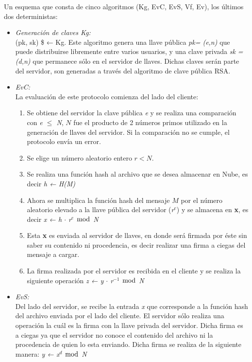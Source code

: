 Un esquema que consta de cinco algoritmos (Kg, EvC, EvS, Vf, Ev), los últimos dos deterministas: 

\begin{itemize}
\item \textit{Generación de claves Kg: } \\
(pk, sk) \$ ← Kg. Este algoritmo genera una llave pública \textit{pk= (e,n)} que puede distribuirse libremente entre varios usuarios, y una clave privada \textit{sk = (d,n)} que permanece sólo en el servidor de llaves. Dichas claves serán parte del servidor, son generadas a través del algoritmo de clave pública RSA.


\item \textit{EvC: }\\ 
La evaluación de este protocolo comienza del lado del cliente: 
\begin {enumerate}
\item Se obtiene del servidor la clave pública \textit{e} y se realiza una comparación con \textit{e $\leq$ N}, $N$ fue el producto de 2 números primos utilizado en la generación de llaves del servidor. Si la comparación no se cumple, el protocolo envía un error.
\item Se elige un número aleatorio entero $r<N$.
\item Se realiza una función hash al archivo que se desea almacenar en Nube, es decir \textit{h ← H(M)} 
\item Ahora se multiplica la función hash del mensaje $M$ por el número aleatorio elevado a la llave pública del servidor (\textit{r$^e$}) y se almacena en \textbf{x}, es decir \textit{x ← h $\cdot$ r$^e$ $\bmod$ N}
\item Esta \textbf{x} es enviada al servidor de llaves, en donde será firmada por éste sin saber su contenido ni procedencia, es decir realizar una firma a ciegas del mensaje a cargar.
\item La firma realizada por el servidor es recibida en el cliente y se realiza la siguiente operación \hspace{2cm} \textit{z ← y $\cdot$ r$^{-1}$ $\bmod$ N}


\end{enumerate}
\item \textit{EvS: }\\ 
Del lado del servidor, se recibe la entrada \textit{x} que corresponde a la función hash del archivo enviada por el lado del cliente. El servidor sólo realiza una operación la cuál es la firma con la llave privada del servidor. Dicha firma es a ciegas ya que el servidor no conoce el contenido del archivo ni la procedencia de quien lo esta enviando. Dicha firma se realiza de la siguiente manera: \hspace{2cm} \textit{y ← x$^d$ $\bmod$ N}



\end{itemize}
